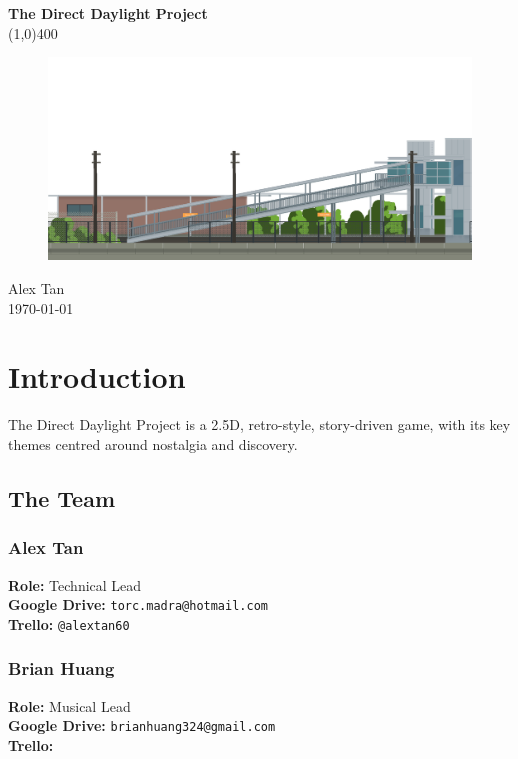 \documentclass[11pt]{article}
\begin{document}
	
\begin{titlepage}
\begin{center}
\huge{\textbf{The Direct Daylight Project}}\\
\line(1,0){400}\\
\vfill{}
\begin{figure}[H]
\centering
\includegraphics[scale=1.0, width=\textwidth]{latex-images/direct-daylight.png}
\end{figure}
\vfill{}
\vfill{}
\Large{Alex Tan}\\
\Large{\today}\\
\end{center}
\thispagestyle{empty}
\end{titlepage}	

\tableofcontents
\thispagestyle{empty}
\clearpage

\setcounter{page}{1}

\section{Introduction}
The Direct Daylight Project is a 2.5D, retro-style, story-driven game, with its key themes centred around nostalgia and discovery.
\subsection{The Team}
\subsubsection{Alex Tan}
\textbf{Role:} Technical Lead\\
\textbf{Google Drive:} \lstinline{torc.madra@hotmail.com}\\
\textbf{Trello:} \lstinline{@alextan60}\\
\subsubsection{Brian Huang}
\textbf{Role:} Musical Lead\\
\textbf{Google Drive:} \lstinline{brianhuang324@gmail.com}\\
\textbf{Trello:} \lstinline{}\\
\end{document}
